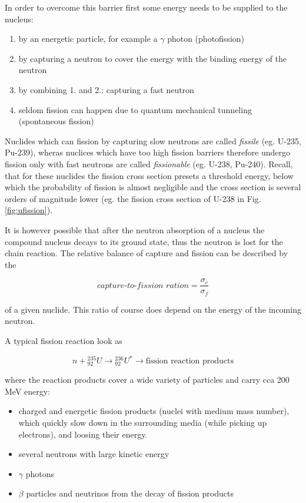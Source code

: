 In order to overcome this barrier first some energy needs to be supplied to the nucleus:

\begin{enumerate}
\item by an energetic particle, for example a $\gamma$ photon (photofission)
\item by capturing a neutron to cover the energy with the binding energy of the neutron
\item by combining 1. and 2.: capturing a fast neutron
\item seldom fission can happen due to quantum mechanical tunneling (spontaneous fission)
\end{enumerate}

Nuclides which can fission by capturing slow neutrons are called \textit{fissile} (eg. U-235, Pu-239), wheras nuclices which have too high fission barriers therefore undergo fission only with fast neutrons are called \textit{fissionable} (eg. U-238, Pu-240). Recall, that for these nuclides the fission cross section presets a threshold energy, below which the probability of fission is almost negligible and the cross section is several orders of magnitude lower (eg. the fission cross section of U-238 in Fig. \ref{fig:ufission}).

It is however possible that after the neutron absorption of a nucleus the compound nucleus decays to its ground state, thus the neutron is lost for the chain reaction. The relative balance of capture and fission can be described by the 

\begin{equation}
\textit{capture-to-fission ration}=\frac{\sigma_c}{\sigma_f}
\end{equation}

of a given nuclide. This ratio of course does depend on the energy of the incoming neutron.

A typical fission reaction look as 

\[
n+{}_{92}^{235}U\rightarrow {}_{92}^{236}U^* \rightarrow \text{fission reaction products}
\]

where the reaction products cover a wide variety of particles and carry cca 200 MeV energy:

\begin{itemize}
\item charged and energetic fission products (nuclei with medium mass number), which quickly slow down in the surrounding media (while picking up electrons), and loosing their energy.
\item several neutrons with large kinetic energy
\item $\gamma$ photons
\item $\beta$ particles and neutrinos from the decay of fission products
\end{itemize}

